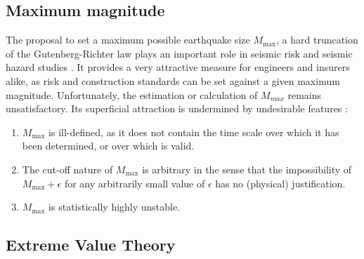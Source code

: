 \documentclass{report}
\begin{document}
\subsection{Maximum magnitude}

The proposal to set a maximum possible earthquake size $M_\mathrm{max}$, a
hard truncation of the Gutenberg-Richter law
\cite{consentino_al77:truncated,dargahi-noubary83:procedure,main_al99:constraints}
plays an important role in seismic risk and seismic hazard studies
\cite{bender_perkins93:_treatment,cornell94:statistical,kijiko_graham98:parametric}. It
provides a very attractive measure for engineers and insurers alike,
as risk and construction standards can be set against a given maximum
magnitude.  Unfortunately, the estimation or calculation of $M_{max}$
remains unsatisfactory. Its superficial attraction is undermined by
undesirable features
\cite{kagan93:statistics,pisarenko_etal08:new_approach}:
\begin{enumerate}
\item $M_\mathrm{max}$ is ill-defined, as it does not contain the time scale over
  which it has been determined, or over which is valid.
\item The cut-off nature of $M_\mathrm{max}$ is arbitrary in the sense that
  the impossibility of $M_\mathrm{max} + \epsilon$ for any arbitrarily small
  value of $\epsilon$ has no (physical) justification.
\item $M_\mathrm{max}$ is statistically highly unstable.
\end{enumerate}

\subsection{Extreme Value Theory}
\end{document}
